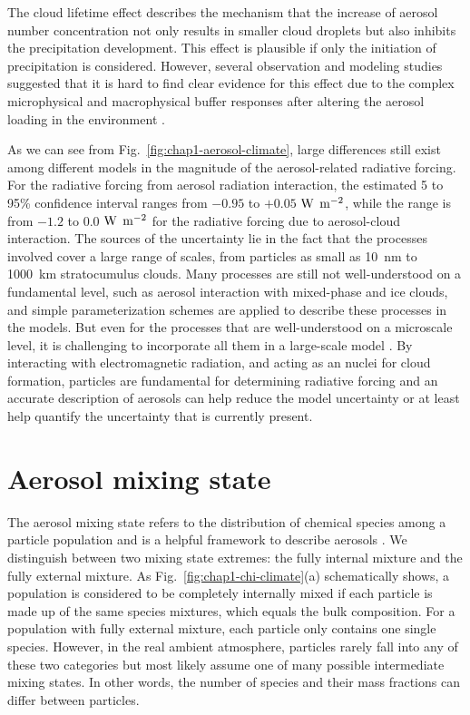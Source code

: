 \documentclass[edeposit,fullpage]{uiucthesis2009}
\begin{document}
The cloud lifetime effect describes the mechanism that the increase of
aerosol number concentration not only results in smaller cloud
droplets but also inhibits the precipitation development. This effect
is plausible if only the initiation of precipitation is
considered. However, several observation and modeling studies
suggested that it is hard to find clear evidence for this effect due
to the complex microphysical and macrophysical buffer responses after
altering the aerosol loading in the environment
\citep{stevens2009untangling}.

As we can see from Fig.~\ref{fig:chap1-aerosol-climate}, large
differences still exist among different models in the magnitude of the
aerosol-related radiative forcing. For the radiative forcing from
aerosol radiation interaction, the estimated 5 to 95\% confidence
interval ranges from $-0.95$ to $+ 0.05$ $\rm W$ $\rm m^{-2}$, while
the range is from $-1.2$ to $0.0$ $\rm W$ $\rm m^{-2}$ for the
radiative forcing due to aerosol-cloud interaction. The sources of the
uncertainty lie in the fact that the processes involved cover a large
range of scales, from particles as small as 10~nm to 1000~km
stratocumulus clouds. Many processes are still not well-understood on
a fundamental level, such as aerosol interaction with mixed-phase and
ice clouds, and simple parameterization schemes are applied to
describe these processes in the models. But even for the processes
that are well-understood on a microscale level, it is challenging to
incorporate all them in a large-scale model
\citep{seinfeld2016improving,bellouin2020bounding}. By interacting
with electromagnetic radiation, and acting as an nuclei for cloud
formation, particles are fundamental for determining radiative forcing
and an accurate description of aerosols can help reduce the model
uncertainty or at least help quantify the uncertainty that is
currently present.

\section{Aerosol mixing state}
The aerosol mixing state refers to the distribution of chemical
species among a particle population and is a helpful framework to
describe aerosols \citep{winkler1973growth}. We distinguish between
two mixing state extremes: the fully internal mixture and the fully
external mixture. As Fig.~\ref{fig:chap1-chi-climate}(a) schematically
shows, a population is considered to be completely internally mixed if
each particle is made up of the same species mixtures, which equals
the bulk composition. For a population with fully external mixture,
each particle only contains one single species. However, in the real
ambient atmosphere, particles rarely fall into any of these two
categories but most likely assume one of many possible intermediate
mixing states. In other words, the number of species and their mass
fractions can differ between particles.
\end{document}
